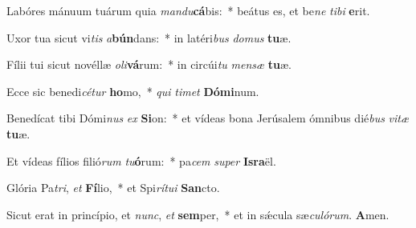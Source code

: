 ﻿\item Labóres mánuum tuárum quia \textit{man}\textit{du}\textbf{cá}bis:~* beátus es, et be\textit{ne} \textit{ti}\textit{bi} \textbf{e}rit.
\item Uxor tua sicut vi\textit{tis} \textit{a}\textbf{bún}dans:~* in latéri\textit{bus} \textit{do}\textit{mus} \textbf{tu}æ.
\item Fílii tui sicut novéllæ \textit{o}\textit{li}\textbf{vá}rum:~* in circúi\textit{tu} \textit{men}\textit{sæ} \textbf{tu}æ.
\item Ecce sic benedi\textit{cé}\textit{tur} \textbf{ho}mo,~* \textit{qui} \textit{ti}\textit{met} \textbf{Dó}\textbf{mi}num.
\item Benedícat tibi Dómi\textit{nus} \textit{ex} \textbf{Si}on:~* et vídeas bona Jerúsalem ómnibus dié\textit{bus} \textit{vi}\textit{tæ} \textbf{tu}æ.
\item Et vídeas fílios filió\textit{rum} \textit{tu}\textbf{ó}rum:~* pa\textit{cem} \textit{su}\textit{per} \textbf{Is}\textbf{ra}ël.
\item Glória Pa\textit{tri}, \textit{et} \textbf{Fí}lio,~* et Spi\textit{rí}\textit{tu}\textit{i} \textbf{San}cto.
\item Sicut erat in princípio, et \textit{nunc}, \textit{et} \textbf{sem}per,~* et in sǽcula sæ\textit{cu}\textit{ló}\textit{rum}. \textbf{A}men.